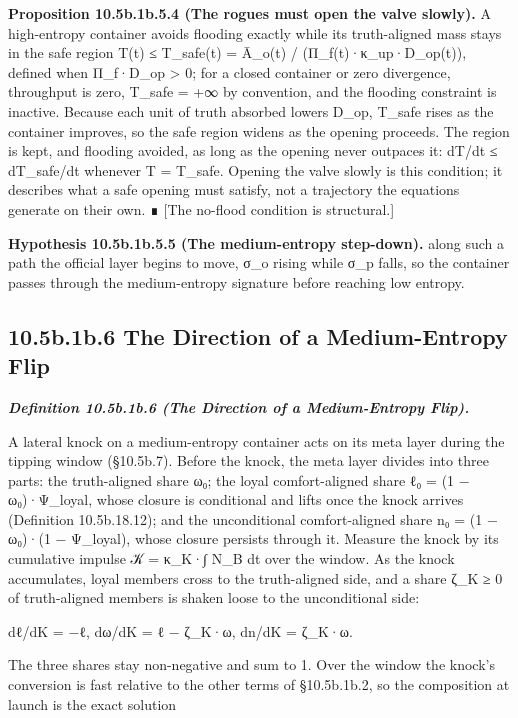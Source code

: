 \documentclass[
]{article}
\begin{document}
\textbf{Proposition 10.5b.1b.5.4 (The rogues must open the valve
slowly).} A high-entropy container avoids flooding exactly while its
truth-aligned mass stays in the safe region T(t) ≤ T\_safe(t) = Ā\_o(t)
/ (Π\_f(t)·κ\_up·D\_op(t)), defined when Π\_f·D\_op \textgreater{} 0;
for a closed container or zero divergence, throughput is zero, T\_safe =
+∞ by convention, and the flooding constraint is inactive. Because each
unit of truth absorbed lowers D\_op, T\_safe rises as the container
improves, so the safe region widens as the opening proceeds. The region
is kept, and flooding avoided, as long as the opening never outpaces it:
dT/dt ≤ dT\_safe/dt whenever T = T\_safe. Opening the valve slowly is
this condition; it describes what a safe opening must satisfy, not a
trajectory the equations generate on their own. ∎ {[}The no-flood
condition is structural.{]}

\textbf{Hypothesis 10.5b.1b.5.5 (The medium-entropy step-down).} along
such a path the official layer begins to move, σ\_o rising while σ\_p
falls, so the container passes through the medium-entropy signature
before reaching low entropy.

\hypertarget{b.1b.6-the-direction-of-a-medium-entropy-flip}{%
\subsection{10.5b.1b.6 The Direction of a Medium-Entropy
Flip}\label{b.1b.6-the-direction-of-a-medium-entropy-flip}}

\emph{\textbf{Definition 10.5b.1b.6 (The Direction of a Medium-Entropy
Flip).}}

A lateral knock on a medium-entropy container acts on its meta layer
during the tipping window (§10.5b.7). Before the knock, the meta layer
divides into three parts: the truth-aligned share ω₀; the loyal
comfort-aligned share ℓ₀ = (1 − ω₀)·Ψ\_loyal, whose closure is
conditional and lifts once the knock arrives (Definition 10.5b.18.12);
and the unconditional comfort-aligned share n₀ = (1 − ω₀)·(1 −
Ψ\_loyal), whose closure persists through it. Measure the knock by its
cumulative impulse 𝒦 = κ\_K·∫ N\_B dt over the window. As the knock
accumulates, loyal members cross to the truth-aligned side, and a share
ζ\_K ≥ 0 of truth-aligned members is shaken loose to the unconditional
side:

dℓ/dK = −ℓ, dω/dK = ℓ − ζ\_K·ω, dn/dK = ζ\_K·ω.

The three shares stay non-negative and sum to 1. Over the window the
knock's conversion is fast relative to the other terms of §10.5b.1b.2,
so the composition at launch is the exact solution
\end{document}
